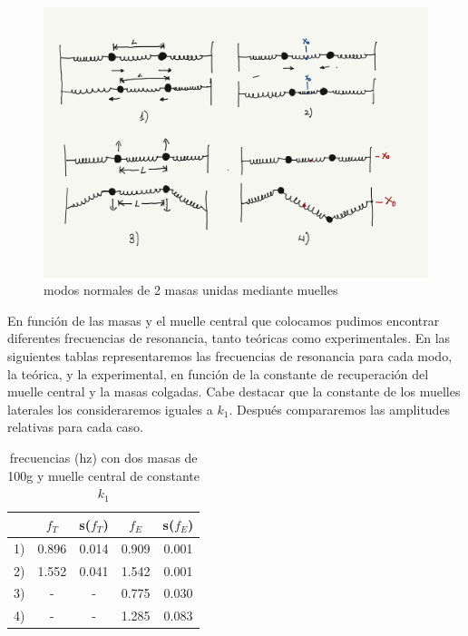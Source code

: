 \documentclass[12pt,a4paper]{article}
\begin{document}
\begin{figure}[h!] \centering
\includegraphics[scale=0.3]{Modo-normal-1.png}
\caption{modos normales de 2 masas unidas mediante muelles}
\label{fig:modos-normales-2-masas}
\end{figure}


En función de las masas y el muelle central que colocamos pudimos encontrar diferentes frecuencias de resonancia, tanto teóricas como experimentales. En las siguientes tablas representaremos las frecuencias de resonancia para cada modo, la teórica, y la experimental, en función de la constante de recuperación del muelle central y la masas colgadas. Cabe destacar que la constante de los muelles laterales los consideraremos iguales a $k_1$. Después compararemos las amplitudes relativas para cada caso. \\

\begin{table}[h!] \centering 
\begin{tabular}{|c|c|c|c|c|}  
\hline 
 	 & $f_T$ 	 & s($f_T$) 	 & $f_E$ 	 & s($f_E$) \\ \hline 
1) 	 & 0.896 	 & 0.014  	 & 0.909   	 & 0.001 \\
2) 	 & 1.552     & 0.041   	 & 1.542   	 & 0.001 \\
3) 	 &   -  	 &    -  	 & 0.775   	 & 0.030 \\
4) 	 &   -  	 &    -  	 & 1.285   	 & 0.083 \\
\hline 
\end{tabular} 
\caption{frecuencias (hz) con dos masas de 100g y muelle central de constante $k_1$}
\label{} 
\end{table}
\end{document}
